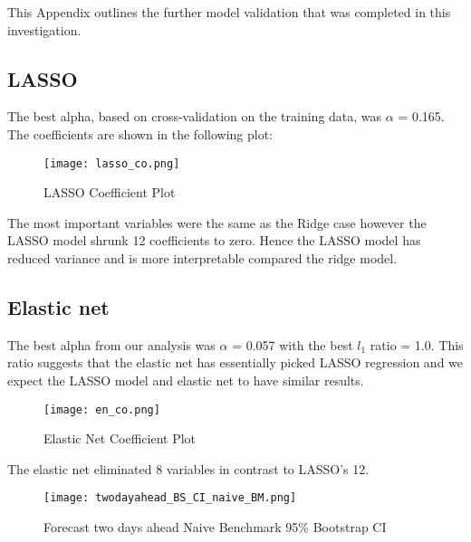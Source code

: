 \documentclass[11pt]{article}
\begin{document}
This Appendix outlines the further model validation that was completed in this investigation.

\subsection{LASSO}
The best alpha, based on cross-validation on the training data, was $\alpha$ = 0.165. The coefficients are shown in the following plot:

\begin{figure}[H]
\centering
\begin{minipage}{.75\textwidth}
  \centering
  \texttt{[image: lasso\_co.png]}
   \caption{LASSO Coefficient Plot}
   \label{fig:lasso_co_appendix}
\end{minipage}%
\end{figure}

The most important variables were the same as the Ridge case however the LASSO model shrunk 12 coefficients to zero. Hence the LASSO model has reduced variance and is more interpretable compared the ridge model.

\subsection{Elastic net}

The best alpha from our analysis was $\alpha$ = 0.057 with the best $l_1$ ratio = 1.0. This ratio suggests that the elastic net has essentially picked LASSO regression and we expect the LASSO model and elastic net to have similar results. 

\begin{figure}[H]
\centering
\begin{minipage}{.75\textwidth}
  \centering
  \texttt{[image: en\_co.png]}
   \caption{Elastic Net Coefficient Plot}
   \label{fig:en_co_appendix}
\end{minipage}%
\end{figure}

The elastic net eliminated 8 variables in contrast to LASSO's 12.


\begin{figure}[H]
\centering
\begin{minipage}{.75\textwidth}
  \centering
  \texttt{[image: twodayahead\_BS\_CI\_naive\_BM.png]}
   \caption{Forecast two days ahead Naive Benchmark 95\% Bootstrap CI}
   \label{fig:twodayahead_BS_CI_naive_BM_appendix}
\end{minipage}%
\end{figure}
\end{document}
